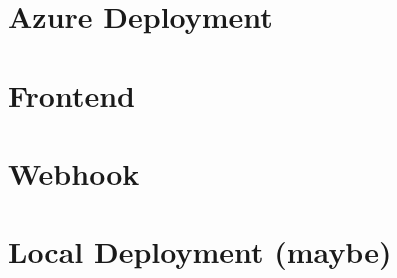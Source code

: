 


\section{Azure Deployment}
\section{Frontend}
\section{Webhook}
\section{Local Deployment (maybe)}